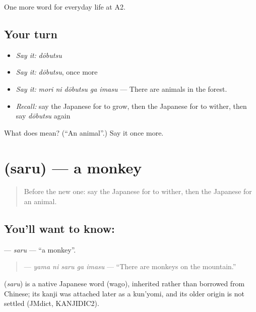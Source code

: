 \begin{grammarlens}[title={What you've built}]
One more word for everyday life at A2.
\end{grammarlens}

\subsection*{Your turn}
\begin{itemize}
\raggedright
  \item \emph{Say it:} \emph{dōbutsu}
  \item \emph{Say it:} \emph{dōbutsu}, once more
  \item \emph{Say it:} \emph{mori ni dōbutsu ga imasu} — There are animals in the forest.
  \item \emph{Recall:} say the Japanese for to grow, then the Japanese for to wither, then say \emph{dōbutsu} again
\end{itemize}

\begin{tcolorbox}[breakable,colback=teal!4,colframe=teal!35!black,title={Before you move on}]
What does  mean? (\textquotedblleft{}An animal\textquotedblright{}.) Say it once more.
\end{tcolorbox}
\section[\texorpdfstring{\ja{さる} (saru)}{さる (saru)}]{ (saru) — a monkey}

\label{lesson:JA-C211-saru}



\begin{quote}
Before the new one: say the Japanese for to wither, then the Japanese for an animal.
\end{quote}

\subsection*{You'll want to know: }
\textbf{} — \emph{saru} — \textquotedblleft{}a monkey\textquotedblright{}.

\begin{quote}
\textbf{  } — \emph{yama ni saru ga imasu} — \textquotedblleft{}There are monkeys on the mountain.\textquotedblright{}
\end{quote}

\begin{cousinweb}
\textbf{} (\emph{saru}) is a native Japanese word (wago), inherited rather than borrowed from Chinese; its kanji was attached later as a kun'yomi, and its older origin is not settled (JMdict, KANJIDIC2).
\end{cousinweb}

